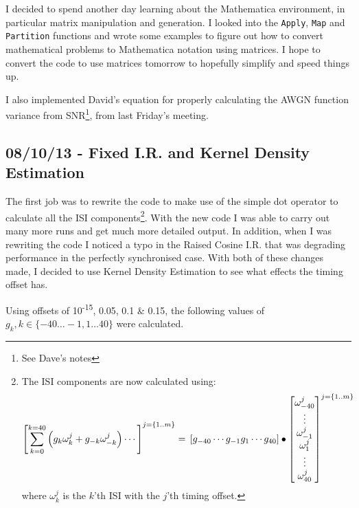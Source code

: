 I decided to spend another day learning about the Mathematica
environment, in particular matrix manipulation and generation. I looked
into the \texttt{Apply}, \texttt{Map} and \texttt{Partition} functions
and wrote some examples to figure out how to convert mathematical
problems to Mathematica notation using matrices. I hope to convert the
code to use matrices tomorrow to hopefully simplify and speed things up.

I also implemented David's equation for properly calculating the AWGN
function variance from SNR\footnote{See Dave's notes}, from last
Friday's meeting.

\subsection{08/10/13 - Fixed I.R. and Kernel Density Estimation}

The first job was to rewrite the code to make use of the simple dot
operator to calculate all the ISI components\footnote{The ISI components
  are now calculated using: \[
  \left [
    \sum_{k=0}^{k=40} \left ( g_k \omega_k^j + g_{-k} \omega_{-k}^j \right ) \cdots
  \right ]^{j=\{1..m\}} = \\
\left [ 
    g_{-40} \cdots g_{-1} g_{1} \cdots g_{40}
  \right ] \bullet \left [
    \begin{matrix}
  \omega_{-40}^j  \\
  \vdots          \\
  \omega_{-1}^j   \\
  \omega_{1}^j     \\
  \vdots            \\
  \omega_{40}^j    \\
    \end{matrix}
  \right ]^{j=\{1..m\}}
  \] where $\omega_{k}^j$ is the $k$'th ISI with the $j$'th timing
  offset.}. With the new code I was able to carry out many more runs and
get much more detailed output. In addition, when I was rewriting the
code I noticed a typo in the Raised Cosine I.R. that was degrading
performance in the perfectly synchronised case. With both of these
changes made, I decided to use Kernel Density Estimation to see what
effects the timing offset has.

Using offsets of 10\textsuperscript{-15}, 0.05, 0.1 \& 0.15, the
following values of $g_k, k \in \{ -40 \dots -1, 1 \dots 40 \}$ were
calculated.

